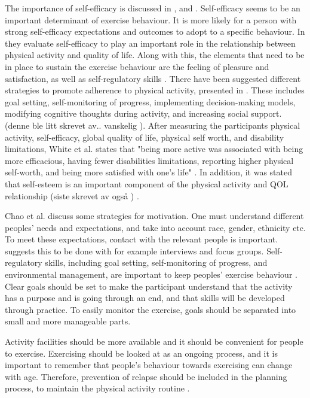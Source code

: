The importance of self-efficacy is discussed in \cite{schutzer}, \cite{chao} and \cite{white}. Self-efficacy seems to be an important determinant of exercise behaviour. It is more likely for a person with strong self-efficacy expectations and outcomes to adopt to a specific behaviour. In \cite{white} they evaluate self-efficacy to play an important role in the relationship between physical activity and quality of life. Along with this, the elements that need to be in place to sustain  the exercise behaviour are the feeling of pleasure and satisfaction, as well as self-regulatory skills \cite{schutzer}. There have been suggested different strategies to promote adherence to physical activity, presented in \cite{chao}. These includes goal setting, self-monitoring of progress, implementing decision-making models, modifying cognitive thoughts during activity, and increasing social support. (denne ble litt skrevet av.. vanskelig \cite{chao}). After measuring the participants physical activity, self-efficacy, global quality of life, physical self worth, and disability limitations, White et al. states that "being more active was associated with being more efficacious, having fewer disabilities limitations, reporting higher physical self-worth, and being more satisfied with one's life" \cite{white}. In addition, it was stated that self-esteem is an important component of the physical activity and QOL relationship (siste skrevet av også ) \cite{white}. 

Chao et al. \cite{chao} discuss some strategies for motivation.  One must understand different peoples' needs and expectations, and take into account race, gender, ethnicity etc.  To meet these expectations, contact with the relevant people is important. \cite{chao} suggests this to be done with for example interviews and focus groups.  Self-regulatory skills, including goal setting, self-monitoring of progress, and environmental management, are important to keep peoples' exercise behaviour \cite{chao}. Clear goals should be set to make the participant understand that the activity has a purpose and is going through an end, and that skills will be developed through practice. To easily monitor the exercise, goals should be separated into small and more manageable parts. 

Activity facilities should be more available and it should be convenient for people to exercise. Exercising should be looked at as an ongoing process, and it is important to remember that people's behaviour towards exercising can change with age. Therefore, prevention of relapse should be included in the planning process, to maintain the physical activity routine \cite{chao}. 

